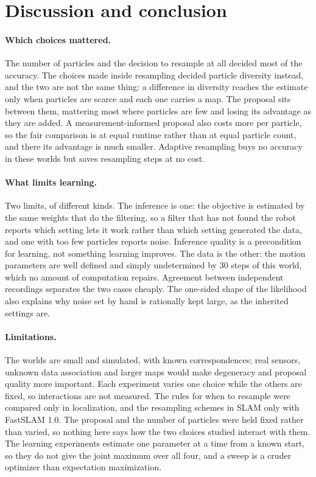 \section{Discussion and conclusion}\label{sec:discussion}

\paragraph{Which choices mattered.} The number of particles and the decision to resample at all decided most of
the accuracy. The choices made inside resampling decided particle diversity instead, and the two are not the same
thing: a difference in diversity reaches the estimate only when particles are scarce and each one carries a map.
The proposal sits between them, mattering most where particles are few and losing its advantage as they are added.
A measurement-informed proposal also costs more per particle, so the fair comparison is at equal runtime rather
than at equal particle count, and there its advantage is much smaller. Adaptive resampling buys no accuracy in
these worlds but saves resampling steps at no cost.

\paragraph{What limits learning.} Two limits, of different kinds. The inference is one: the objective is
estimated by the same weights that do the filtering, so a filter that has not found the robot reports which
setting lets it work rather than which setting generated the data, and one with too few particles reports noise.
Inference quality is a precondition for learning, not something learning improves. The data is the other: the
motion parameters are well defined and simply undetermined by 30 steps of this world, which no amount of
computation repairs. Agreement between independent recordings separates the two cases cheaply. The one-sided
shape of the likelihood also explains why noise set by hand is rationally kept large, as the inherited settings
are.

\paragraph{Limitations.} The worlds are small and simulated, with known correspondences; real sensors, unknown
data association and larger maps would make degeneracy and proposal quality more important. Each experiment
varies one choice while the others are fixed, so interactions are not measured. The rules for when to resample
were compared only in localization, and the resampling schemes in SLAM only with FastSLAM 1.0. The proposal and
the number of particles were held fixed rather than varied, so nothing here says how the two choices studied
interact with them. The learning
experiments estimate one parameter at a time from a known start, so they do not give the joint maximum over all
four, and a sweep is a cruder optimizer than expectation maximization.

